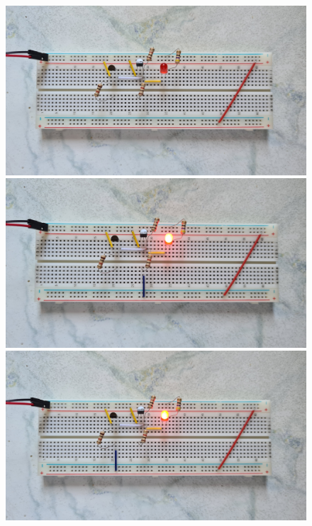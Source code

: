 \begin{figure}[h!]
	\begin{minipage}{.5\textwidth}
		\centering
		\includegraphics[scale=.05]{./Fotos/ODER-00.jpg}
		\vspace{1cm}
	\end{minipage}%
	\begin{minipage}{.5\textwidth}
		\centering
		\includegraphics[scale=.05]{./Fotos/ODER-01.jpg}
		\vspace{1cm}
	\end{minipage}
	\begin{minipage}{.5\textwidth}
		\centering
		\includegraphics[scale=.05]{./Fotos/ODER-10.jpg}

\end{minipage}
\end{figure}
